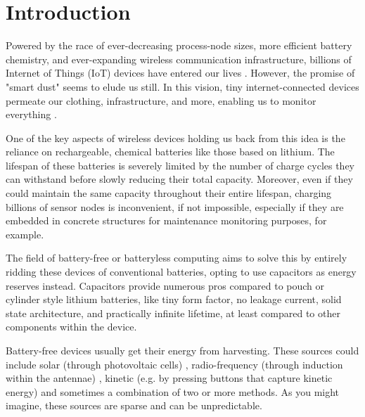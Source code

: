 \chapter{Introduction}
\label{chp:introduction}

\nocite{*}

Powered by the race of ever-decreasing process-node sizes, more efficient battery chemistry, and ever-expanding wireless communication infrastructure, billions of Internet of Things (IoT) devices have entered our lives \cite{arif_2021, microsoft_2019}. However, the promise of "smart dust" seems to elude us still\cite{hester_2017}. In this vision, tiny internet-connected devices permeate our clothing, infrastructure, and more, enabling us to monitor everything \cite{marr_2018}.

One of the key aspects of wireless devices holding us back from this idea is the reliance on rechargeable, chemical batteries like those based on lithium. The lifespan of these batteries is severely limited by the number of charge cycles they can withstand before slowly reducing their total capacity. Moreover, even if they could maintain the same capacity throughout their entire lifespan, charging billions of sensor nodes is inconvenient, if not impossible, especially if they are embedded in concrete structures for maintenance monitoring purposes, for example.

The field of battery-free or batteryless computing aims to solve this by entirely ridding these devices of conventional batteries, opting to use capacitors as energy reserves instead\cite{freebie, hester_2017, satya_2019}. Capacitors provide numerous pros compared to pouch or cylinder style lithium batteries, like tiny form factor, no leakage current, solid state architecture, and practically infinite lifetime, at least compared to other components within the device. 

Battery-free devices usually get their energy from harvesting. These sources could include solar (through photovoltaic cells) \cite{gameboy, colin_2018}, radio-frequency (through induction within the antennae) \cite{gollakota_2014, wisp_2005}, kinetic (e.g. by pressing buttons that capture kinetic energy) \cite{gameboy} and sometimes a combination of two or more methods. As you might imagine, these sources are sparse and can be unpredictable. 

